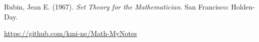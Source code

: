 \documentclass[autodetect-engine, ja=standard, base=9pt, b5j, english]{bxjsreport}
\begin{document}
Rubin, Jean E. (1967). \textit{Set Theory for the Mathematician}. San Francisco: Holden-Day.

\url{https://github.com/kmi-ne/Math-MyNotes}


\end{document}
